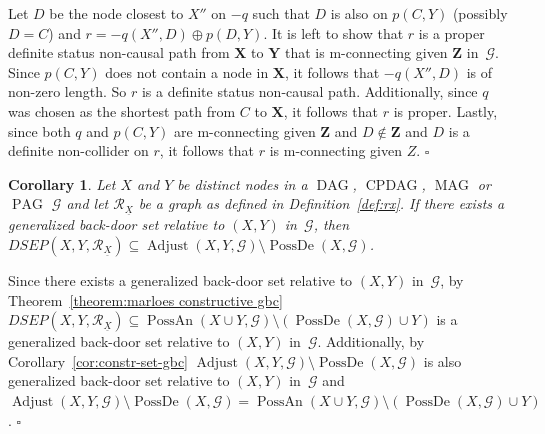 \documentclass[11pt,a4paper]{article}
\newtheorem{corollary}[definition]{Corollary}
\newenvironment{proofof}[1][]{\begin{trivlist}
   \item[\hskip \labelsep {\bfseries Proof of #1.}]}{\hfill{}$\square$\end{trivlist}}
\DeclareMathOperator{\CPDAG}{CPDAG}
\DeclareMathOperator{\DAG}{DAG}
\DeclareMathOperator{\MAG}{MAG}
\DeclareMathOperator{\PAG}{PAG}
\DeclareMathOperator{\PossDe}{PossDe}
\DeclareMathOperator{\PossAn}{PossAn}
\DeclareMathOperator{\Adjust}{Adjust}
\newcommand{\g}[1][G]{\mathcal{#1}}
\newcommand{\gout}[2][G]{\mathcal{#1}_{\underline{#2}}}
\newcommand{\dsep}[2][X,Y]{DSEP(#1,#2)}
\newcommand{\adjust}[2][X,Y]{\Adjust(#1,#2)}
\begin{document}
\begin{proofof}[Lemma~\ref{lemma:adjust xy gbc cond 2}]
Let $D$ be the node closest to $X''$ on $-q$ such that $D$ is also on $p(C,Y)$ (possibly $D=C$) and $r = -q(X'',D) \oplus p(D,Y)$. It is left to show that $r$ is a proper definite status non-causal path from $\mathbf{X}$ to $\mathbf{Y}$ that is m-connecting given $\mathbf{Z}$ in~$\g$. Since $p(C,Y)$ does not contain a node in $\mathbf{X}$, it follows that $-q(X'',D)$ is of non-zero length. So $r$ is a definite status non-causal path. Additionally, since $q$ was chosen as the shortest path from $C$ to $\mathbf{X}$, it follows that $r$ is proper. Lastly, since both $q$ and $p(C,Y)$ are m-connecting given $\mathbf{Z}$ and $D \notin \mathbf{Z}$ and $D$ is a definite non-collider on $r$, it follows that $r$ is m-connecting given $Z$.
\end{proofof}

\begin{corollary} Let $X$ and $Y$ be distinct nodes in a $\DAG$, $\CPDAG$, $\MAG$ or $\PAG$ $\g$ and let $\gout[R]{X}$ be a graph as defined in Definition~\ref{def:rx}. If there exists a generalized back-door set relative to $(X,Y)$ in~$\g$, then $\dsep{\gout[R]{X}} \subseteq \adjust{\g} \setminus \PossDe(X,\g)$.
\label{cor:dsep adjust}
\end{corollary}

\begin{proofof}[Corollary~\ref{cor:dsep adjust}]
Since there exists a generalized back-door set relative to $(X,Y)$ in~$\g$, by Theorem~\ref{theorem:marloes constructive gbc} $\dsep{\gout[R]{X}} \subseteq \PossAn(X \cup Y,\g) \setminus (\PossDe(X,\g) \cup Y)$ is a generalized back-door set relative to $(X,Y)$ in~$\g$.
Additionally, by Corollary~\ref{cor:constr-set-gbc} $\adjust{\g} \setminus \PossDe(X,\g)$ is also generalized back-door set relative to $(X,Y)$ in~$\g$ and $\adjust{\g} \setminus \PossDe(X,\g) = \PossAn(X \cup Y,\g) \setminus (\PossDe(X,\g) \cup Y)$.
\end{proofof}
\end{document}
